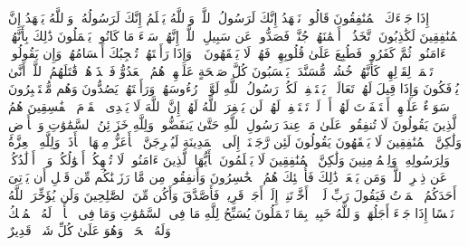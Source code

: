 \stopbuffer%
\startbuffer[\q:63:1]
إِذَا جَاۤءَكَ ٱلۡمُنَٰفِقُونَ قَالُوا۟ نَشۡهَدُ إِنَّكَ لَرَسُولُ ٱللَّهِۗ وَٱللَّهُ یَعۡلَمُ إِنَّكَ لَرَسُولُهُۥ وَٱللَّهُ یَشۡهَدُ إِنَّ ٱلۡمُنَٰفِقِینَ لَكَٰذِبُونَ%
\stopbuffer%
\startbuffer[\q:63:2]
ٱتَّخَذُوۤا۟ أَیۡمَٰنَهُمۡ جُنَّةࣰ فَصَدُّوا۟ عَن سَبِیلِ ٱللَّهِۚ إِنَّهُمۡ سَاۤءَ مَا كَانُوا۟ یَعۡمَلُونَ%
\stopbuffer%
\startbuffer[\q:63:3]
ذَٰلِكَ بِأَنَّهُمۡ ءَامَنُوا۟ ثُمَّ كَفَرُوا۟ فَطُبِعَ عَلَىٰ قُلُوبِهِمۡ فَهُمۡ لَا یَفۡقَهُونَ%
\stopbuffer%
\startbuffer[\q:63:4]
۞ وَإِذَا رَأَیۡتَهُمۡ تُعۡجِبُكَ أَجۡسَامُهُمۡۖ وَإِن یَقُولُوا۟ تَسۡمَعۡ لِقَوۡلِهِمۡۖ كَأَنَّهُمۡ خُشُبࣱ مُّسَنَّدَةࣱۖ یَحۡسَبُونَ كُلَّ صَیۡحَةٍ عَلَیۡهِمۡۚ هُمُ ٱلۡعَدُوُّ فَٱحۡذَرۡهُمۡۚ قَٰتَلَهُمُ ٱللَّهُۖ أَنَّىٰ یُؤۡفَكُونَ%
\stopbuffer%
\startbuffer[\q:63:5]
وَإِذَا قِیلَ لَهُمۡ تَعَالَوۡا۟ یَسۡتَغۡفِرۡ لَكُمۡ رَسُولُ ٱللَّهِ لَوَّوۡا۟ رُءُوسَهُمۡ وَرَأَیۡتَهُمۡ یَصُدُّونَ وَهُم مُّسۡتَكۡبِرُونَ%
\stopbuffer%
\startbuffer[\q:63:6]
سَوَاۤءٌ عَلَیۡهِمۡ أَسۡتَغۡفَرۡتَ لَهُمۡ أَمۡ لَمۡ تَسۡتَغۡفِرۡ لَهُمۡ لَن یَغۡفِرَ ٱللَّهُ لَهُمۡۚ إِنَّ ٱللَّهَ لَا یَهۡدِی ٱلۡقَوۡمَ ٱلۡفَٰسِقِینَ%
\stopbuffer%
\startbuffer[\q:63:7]
هُمُ ٱلَّذِینَ یَقُولُونَ لَا تُنفِقُوا۟ عَلَىٰ مَنۡ عِندَ رَسُولِ ٱللَّهِ حَتَّىٰ یَنفَضُّوا۟ۗ وَلِلَّهِ خَزَاۤئِنُ ٱلسَّمَٰوَٰتِ وَٱلۡأَرۡضِ وَلَٰكِنَّ ٱلۡمُنَٰفِقِینَ لَا یَفۡقَهُونَ%
\stopbuffer%
\startbuffer[\q:63:8]
یَقُولُونَ لَئِن رَّجَعۡنَاۤ إِلَى ٱلۡمَدِینَةِ لَیُخۡرِجَنَّ ٱلۡأَعَزُّ مِنۡهَا ٱلۡأَذَلَّۚ وَلِلَّهِ ٱلۡعِزَّةُ وَلِرَسُولِهِۦ وَلِلۡمُؤۡمِنِینَ وَلَٰكِنَّ ٱلۡمُنَٰفِقِینَ لَا یَعۡلَمُونَ%
\stopbuffer%
\startbuffer[\q:63:9]
یَٰۤأَیُّهَا ٱلَّذِینَ ءَامَنُوا۟ لَا تُلۡهِكُمۡ أَمۡوَٰلُكُمۡ وَلَاۤ أَوۡلَٰدُكُمۡ عَن ذِكۡرِ ٱللَّهِۚ وَمَن یَفۡعَلۡ ذَٰلِكَ فَأُو۟لَٰۤئِكَ هُمُ ٱلۡخَٰسِرُونَ%
\stopbuffer%
\startbuffer[\q:63:10]
وَأَنفِقُوا۟ مِن مَّا رَزَقۡنَٰكُم مِّن قَبۡلِ أَن یَأۡتِیَ أَحَدَكُمُ ٱلۡمَوۡتُ فَیَقُولَ رَبِّ لَوۡلَاۤ أَخَّرۡتَنِیۤ إِلَىٰۤ أَجَلࣲ قَرِیبࣲ فَأَصَّدَّقَ وَأَكُن مِّنَ ٱلصَّٰلِحِینَ%
\stopbuffer%
\startbuffer[\q:63:11]
وَلَن یُؤَخِّرَ ٱللَّهُ نَفۡسًا إِذَا جَاۤءَ أَجَلُهَاۚ وَٱللَّهُ خَبِیرُۢ بِمَا تَعۡمَلُونَ%
\stopbuffer%
\startbuffer[\q:64:1]
یُسَبِّحُ لِلَّهِ مَا فِی ٱلسَّمَٰوَٰتِ وَمَا فِی ٱلۡأَرۡضِۖ لَهُ ٱلۡمُلۡكُ وَلَهُ ٱلۡحَمۡدُۖ وَهُوَ عَلَىٰ كُلِّ شَیۡءࣲ قَدِیرٌ%
\stopbuffer%
